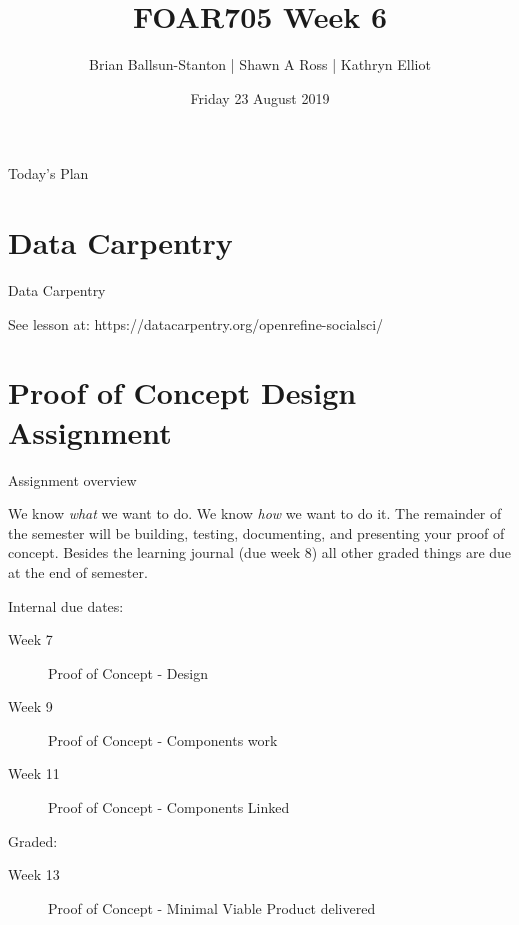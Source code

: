 \documentclass[aspectratio=1610, 11pt]{beamer} %
\title{FOAR705 Week 6} %
\author{Brian Ballsun-Stanton | Shawn A Ross | Kathryn Elliot}               %
\institute{Faculty of Arts}         %
\date{Friday 23 August 2019}                 %
\begin{document}

\maketitle

  

\begin{frame}{Today's Plan}
  \tableofcontents
\end{frame}

\section{Data Carpentry}
\begin{frame}{Data Carpentry}

See lesson at: https://datacarpentry.org/openrefine-socialsci/

\end{frame}
\section{Proof of Concept Design Assignment}
\begin{frame}{Assignment overview}

We know \textit{what} we want to do. We know \textit{how} we want to do it. The remainder of the semester will be building, testing, documenting, and presenting your proof of concept. Besides the learning journal (due week 8) all other graded things are due at the end of semester.

Internal due dates:

\begin{description}
\item [Week 7] Proof of Concept - Design 
\item [Week 9] Proof of Concept - Components work
\item [Week 11] Proof of Concept - Components Linked
\end{description}

Graded: 
\begin{description}
\item [Week 13] Proof of Concept - Minimal Viable Product delivered
\end{description}
\end{frame}
\end{document}
